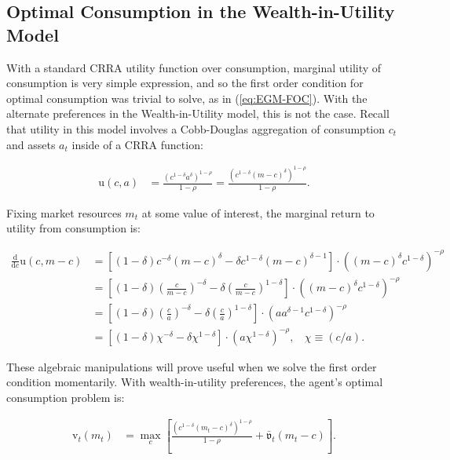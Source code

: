 \documentclass{article}
\newcommand{\CRRA}{\rho}
\newcommand{\uFunc}{\mathrm{u}}
\newcommand{\vFunc}{\mathrm{v}}
\newcommand{\cNrm}{c}
\newcommand{\mNrm}{m}
\newcommand{\aNrm}{a}
\begin{document}
\subsection{Optimal Consumption in the Wealth-in-Utility Model}

With a standard CRRA utility function over consumption, marginal utility of consumption is very simple expression, and so the first order condition for optimal consumption was trivial to solve, as in (\ref{eq:EGM-FOC}). With the alternate preferences in the Wealth-in-Utility model, this is not the case. Recall that utility in this model involves a Cobb-Douglas aggregation of consumption $\cNrm_t$ and assets $\aNrm_t$ inside of a CRRA function:

\begin{align}
    \uFunc(\cNrm, \aNrm) & = \frac{\left(\cNrm^{1-\delta}\aNrm^{\delta}\right)^{1-\CRRA}}{1-\CRRA} = \frac{\left(\cNrm^{1-\delta}(\mNrm - \cNrm)^{\delta}\right)^{1-\CRRA}}{1-\CRRA}.
\end{align}

Fixing market resources $\mNrm_t$ at some value of interest, the marginal return to utility from consumption is:

\begin{align}
\frac{\text{d}}{\text{d} \cNrm} \uFunc(\cNrm, \mNrm-\cNrm) &= \left[ (1-\delta) \cNrm^{-\delta} (\mNrm - \cNrm)^\delta - \delta \cNrm^{1-\delta}(\mNrm - \cNrm)^{\delta-1} \right] \cdot \left( (\mNrm - \cNrm)^\delta \cNrm^{1-\delta}  \right)^{-\CRRA} \\
 &= \left[ (1-\delta) \left(\frac{\cNrm}{\mNrm-\cNrm}\right)^{-\delta} - \delta \left(\frac{\cNrm}{\mNrm - \cNrm} \right)^{1-\delta} \right] \cdot \left( (\mNrm - \cNrm)^\delta \cNrm^{1-\delta}  \right)^{-\CRRA} \\
 &= \left[ (1-\delta) \left(\frac{\cNrm}{\aNrm}\right)^{-\delta} - \delta \left(\frac{\cNrm}{\aNrm} \right)^{1-\delta} \right] \cdot \left( \aNrm \aNrm^{\delta-1} \cNrm^{1-\delta}  \right)^{-\CRRA} \\
 &= \left[ (1-\delta) \chi^{-\delta} - \delta \chi^{1-\delta} \right] \cdot \left( \aNrm \chi^{1-\delta}  \right)^{-\CRRA}, ~~~~ \chi \equiv (\cNrm/\aNrm).
\end{align}

These algebraic manipulations will prove useful when we solve the first order condition momentarily. With wealth-in-utility preferences, the agent's optimal consumption problem is:

\begin{align}
\vFunc_t(\mNrm_t) &= \max_\cNrm \left[ \frac{\left(\cNrm^{1-\delta}(\mNrm_t - \cNrm)^{\delta}\right)^{1-\CRRA}}{1-\CRRA} + \bar{\mathfrak{v}}_t(\mNrm_t - \cNrm) \right].
\end{align}
\end{document}
